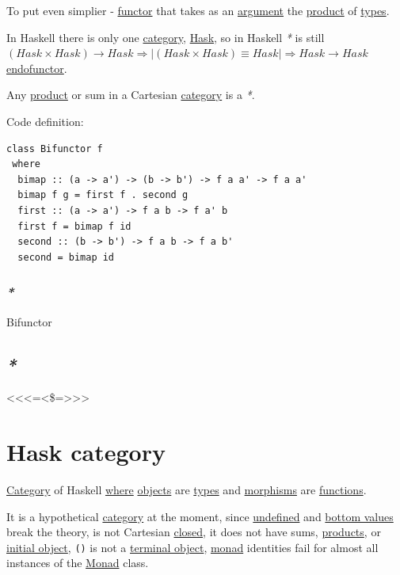 \documentclass[a4paper,14pt,oneside]{book}
\begin{document}
To put even simplier - \hyperref[org61d5270]{functor} that takes as an \hyperref[org4072c80]{argument} the \hyperref[org90a2f94]{product} of \hyperref[orge9a3a14]{types}.

In Haskell there is only one \hyperref[orge2e250a]{category}, \hyperref[org70e1f79]{Hask}, so in Haskell \emph{*} is still \((Hask \times Hask) \rightarrow Hask \Rightarrow | (Hask \times Hask) \equiv Hask | \Rightarrow Hask \rightarrow Hask\) \hyperref[org30698a4]{endofunctor}.

Any \hyperref[org90a2f94]{product} or sum in a Cartesian \hyperref[orge2e250a]{category} is a \emph{*}.

Code definition:
\begin{verbatim}
class Bifunctor f
 where
  bimap :: (a -> a') -> (b -> b') -> f a a' -> f a a'
  bimap f g = first f . second g
  first :: (a -> a') -> f a b -> f a' b
  first f = bimap f id
  second :: (b -> b') -> f a b -> f a b'
  second = bimap id
\end{verbatim}

\subsubsection{\emph{*}}
\label{sec:org299d883}
\label{org3f476fc}Bifunctor

\subsection{\emph{*}}
\label{sec:org651de90}

<<<=<\$=>>>

\section{\label{org6ed178e}Hask category}
\label{sec:org256a261}
\hyperref[orge2e250a]{Category} of Haskell \hyperref[org6c63c7a]{where} \hyperref[orgde02dc0]{objects} are \hyperref[orge9a3a14]{types} and \hyperref[org46b4110]{morphisms} are \hyperref[org934327c]{functions}.

It is a hypothetical \hyperref[orge2e250a]{category} at the moment, since \hyperref[org776fc74]{undefined} and \hyperref[org20a63fb]{bottom values} break the theory, is not Cartesian \hyperref[org1eeda67]{closed}, it does not have sums, \hyperref[org132a605]{products}, or \hyperref[org285dba8]{initial object}, \texttt{()} is not a \hyperref[org83d711d]{terminal object}, \hyperref[orged38b8b]{monad} identities fail for almost all instances of the \hyperref[orged38b8b]{Monad} class.
\end{document}
